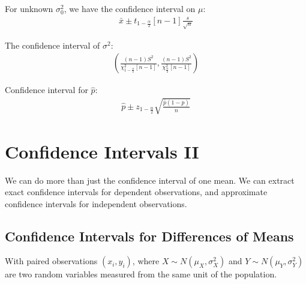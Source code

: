                 For unknown $\sigma_0^2$, we have the confidence interval on $\mu$:
                \begin{align*}
                    \bar{x} \pm t_{1 - \frac{\alpha}{2}}[n-1] \frac{s}{\sqrt{n}}
                \end{align*}

                The confidence interval of $\sigma^2$:
                \begin{align*}
                    \left(
                        \frac{(n-1)S^2}{\chi_{1-\frac{\alpha}{2}}^2 [n - 1]},
                        \frac{(n-1)S^2}{\chi_{\frac{\alpha}{2}}^2 [n - 1]}
                    \right)
                \end{align*}

                Confidence interval for $\hat{p}$:
                \begin{align*}
                    \hat{p} \pm z_{1 - \frac{\alpha}{2}} \sqrt{\frac{\hat{p} ( 1 - \hat{p})}{n}}
                \end{align*}
        \chapter{Confidence Intervals II} %
        \label{cha:confidence_intervals_ii}
            We can do more than just the confidence interval of one mean.
            We can extract exact confidence intervals for dependent observations, and approximate confidence intervals for independent observations.

            \section{Confidence Intervals for Differences of Means} %
            \label{sec:confidence_intervals_for_differences_of_means}
                With paired observations $(x_i, y_i)$, where $X \sim N(\mu_X, \sigma_X^2)$ and $Y \sim N(\mu_Y, \sigma_Y^2)$ are two random variables measured from the same unit of the population.

